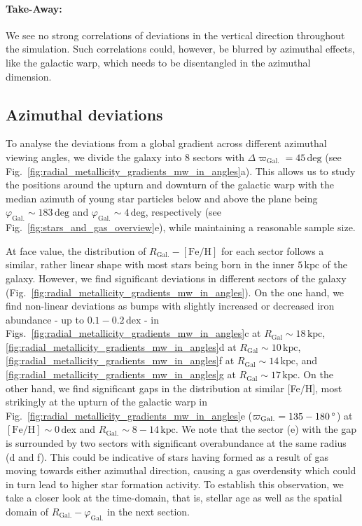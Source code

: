 \documentclass[fleqn,usenatbib]{mnras}
\begin{document}
\paragraph*{Take-Away:} We see no strong correlations of deviations in the vertical direction throughout the simulation. Such correlations could, however, be blurred by azimuthal effects, like the galactic warp, which needs to be disentangled in the azimuthal dimension.

\subsection{Azimuthal deviations}
\label{sec:coherence_azimuth_radial_metallicity_gradients}

To analyse the deviations from a global gradient across different azimuthal viewing angles, we divide the galaxy into 8 sectors with $\Delta \varpi_\mathrm{Gal.} = 45\,\mathrm{deg}$ (see Fig.~\ref{fig:radial_metallicity_gradients_mw_in_angles}a). This allows us to study the positions around the upturn and downturn of the galactic warp with the median azimuth of young star particles below and above the plane being $\varphi_\mathrm{Gal.} \sim 183\,\mathrm{deg}$ and $\varphi_\mathrm{Gal.} \sim 4\,\mathrm{deg}$, respectively (see Fig.~\ref{fig:stars_and_gas_overview}e), while maintaining a reasonable sample size.

At face value, the distribution of $R_\mathrm{Gal.}-\mathrm{[Fe/H]}$ for each sector follows a similar, rather linear shape with most stars being born in the inner $5\,\mathrm{kpc}$ of the galaxy. However, we find significant deviations in different sectors of the galaxy (Fig.~\ref{fig:radial_metallicity_gradients_mw_in_angles}). On the one hand, we find non-linear deviations as bumps with slightly increased or decreased iron abundance - up to $0.1-0.2\,\mathrm{dex}$ - in Figs.~\ref{fig:radial_metallicity_gradients_mw_in_angles}c at $R_\mathrm{Gal} \sim 18\,\mathrm{kpc}$, \ref{fig:radial_metallicity_gradients_mw_in_angles}d at $R_\mathrm{Gal} \sim 10\,\mathrm{kpc}$, \ref{fig:radial_metallicity_gradients_mw_in_angles}f at $R_\mathrm{Gal} \sim 14\,\mathrm{kpc}$, and \ref{fig:radial_metallicity_gradients_mw_in_angles}g at $R_\mathrm{Gal} \sim 17\,\mathrm{kpc}$. On the other hand, we find significant gaps in the distribution at similar [Fe/H], most strikingly at the upturn of the galactic warp in Fig.~\ref{fig:radial_metallicity_gradients_mw_in_angles}e ($\varpi_\mathrm{Gal.} = 135-180\,\mathrm{\degree}$) at $\mathrm{[Fe/H]} \sim 0\,\mathrm{dex}$ and $R_\mathrm{Gal.} \sim 8-14\,\mathrm{kpc}$. We note that the sector (e) with the gap is surrounded by two sectors with significant overabundance at the same radius (d and f). This could be indicative of stars having formed as a result of gas moving towards either azimuthal direction, causing a gas overdensity which could in turn lead to higher star formation activity. To establish this observation, we take a closer look at the time-domain, that is, stellar age as well as the spatial domain of $R_\mathrm{Gal.}-\varphi_\mathrm{Gal.}$ in the next section. 
\end{document}
